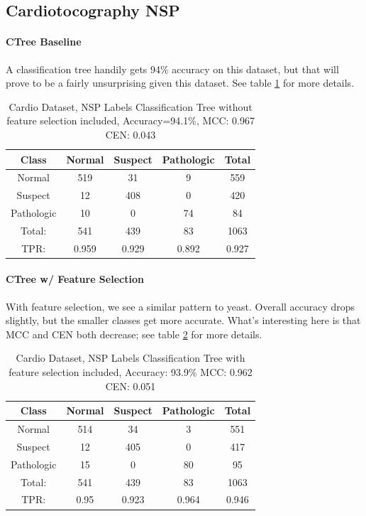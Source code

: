 \subsection{Cardiotocography NSP}
\paragraph{CTree Baseline}
A classification tree handily gets 94\% accuracy on this dataset, but that will prove to be a fairly unsurprising given this dataset.  See table \ref{tab:cardioNSPctreebase} for more details.
\begin{table}[h!]
	\centering
	\begin{tabular}{|c|c|c|c|c|}
		\hline
		Class&Normal&Suspect&Pathologic&Total\\\hline
Normal&519&31&9&559\\
Suspect&12&408&0&420\\
Pathologic&10&0&74&84\\\hline
Total:&541&439&83&1063\\
TPR:&0.959&0.929&0.892&0.927\\
		\hline
	\end{tabular}
	\caption[Cardiotocography NSP: Classification Tree without Feature Selection Confusion Matrix]{Cardio Dataset, NSP Labels Classification Tree without feature selection included, Accuracy=94.1\%, MCC: 0.967 CEN: 0.043}
	\label{tab:cardioNSPctreebase}
\end{table}
\paragraph{CTree w/ Feature Selection}
With feature selection, we see a similar pattern to yeast.  Overall accuracy drops slightly, but the smaller classes get more accurate.  What's interesting here is that MCC and CEN both decrease; see table \ref{tab:cardioNSPctree} for more details.
\begin{table}[h]
	\centering
	\begin{tabular}{|c|c|c|c|c|}
		\hline
		Class&Normal&Suspect&Pathologic&Total\\\hline
Normal&514&34&3&551\\
Suspect&12&405&0&417\\
Pathologic&15&0&80&95\\\hline
Total:&541&439&83&1063\\
TPR:&0.95&0.923&0.964&0.946\\

		\hline
	\end{tabular}
	\caption[Cardiotocography NSP: Classification Tree with Feature Selection Confusion Matrix]{Cardio Dataset, NSP Labels Classification Tree with feature selection included, Accuracy: 93.9\% MCC: 0.962 CEN: 0.051}
	\label{tab:cardioNSPctree}
\end{table}

